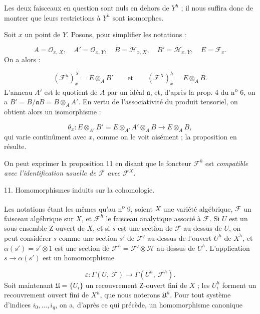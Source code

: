 Les deux faisceaux en question sont nuls en dehors de $Y^h$ ; il nous suffira donc de montrer que leurs restrictions à $Y^h$ sont isomorphes.

Soit $x$ un point de $Y$. Posons, pour simplifier les notations :

\begin{equation*}
A = \mathcal{O}_{x,\,X}, \quad A' = \mathcal{O}_{x,\,Y}, \quad B = \mathcal{H}_{x,\,X}, \quad B' = \mathcal{H}_{x,\,Y}, \quad E = \mathcal{F}_x.
\end{equation*}
On a alors :

\begin{equation*}
(\mathcal{F}^h)^{X}_{x} = E \otimes_A B' \qquad \mathrm{et} \qquad (\mathcal{F}^{X})^{h}_{x} = E \otimes_A B.
\end{equation*}
L'anneau $A'$ est le quotient de $A$ par un idéal $\mathfrak{a}$, et, d'après la prop. 4 du n\textsuperscript{o} 6, on a $B' = B/\mathfrak{a}B = B \otimes_A A'$. En vertu de l'associativité du produit tensoriel, on obtient alors un isomorphisme :

\begin{equation*}
\theta_x : E \otimes_{A'} B' = E \otimes_{A'} A' \otimes_A B \to E \otimes_A B,
\end{equation*}
qui varie continûment avec $x$, comme on le voit aisément ; la proposition en résulte.

On peut exprimer la proposition 11 en disant que le foncteur $\mathcal{F}^h$ est \emph{compatible avec l'identification usuelle de $\mathcal{F}$ avec $\mathcal{F}^X$}.


11. Homomorphismes induits sur la cohomologie.

Les notations étant les mêmes qu'au n\textsuperscript{o} 9, soient $X$ une variété algébrique, $\mathcal{F}$ un faisceau algébrique sur $X$, et $\mathcal{F}^h$ le faisceau analytique associé à $\mathcal{F}$. Si $U$ est un sous-ensemble Z-ouvert de $X$, et si $s$ est une section de $\mathcal{F}$ au-dessus de $U$, on peut considérer $s$ comme une section $s'$ de $\mathcal{F}'$ au-dessus de l'ouvert $U^h$ de $X^h$, et $\alpha(s') = s' \otimes 1$ est une section de $\mathcal{F}^h = \mathcal{F}' \otimes \mathcal{H}$ au-dessus de $U^h$. L'application $s \to \alpha(s')$ est un homomorphisme

\begin{equation*}
\varepsilon : \Gamma(U, \ \mathcal{F}) \to \Gamma(U^h, \ \mathcal{F}^h).
\end{equation*}
Soit maintenant $\mathfrak{U} = \{U_i\}$ un recouvrement Z-ouvert fini de $X$ ; les $U_i^h$ forment un recouvrement ouvert fini de $X^h$, que nous noterons $\mathfrak{U}^h$. Pour tout système d'indices $i_0, \ldots, i_q$, on a, d'après ce qui précède, un homomorphisme canonique

